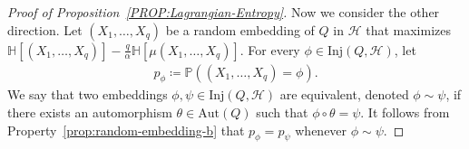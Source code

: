 \documentclass[11pt,a4paper]{article}
\begin{document}
\begin{proof}[Proof of Proposition~\ref{PROP:Lagrangian-Entropy}]
    Now we consider the other direction. 
    Let $(X_1, \ldots, X_{q})$ be a random embedding of $Q$ in $\mathcal{H}$ that maximizes $\mathbb{H}[(X_1, \ldots, X_{q})] - \frac{q}{\alpha} \mathbb{H}[\mu(X_1, \ldots, X_q)]$. 
    For every $\phi \in \mathrm{Inj}(Q, \mathcal{H})$, let 
    \begin{align*}
        p_{\phi}
        \coloneqq \mathbb{P}\left((X_1, \ldots, X_q) = \phi \right). 
    \end{align*}
    We say that two embeddings $\phi, \psi \in \mathrm{Inj}(Q,\mathcal{H})$ are equivalent, denoted $\phi \sim \psi$, if there exists an automorphism $\theta \in \mathrm{Aut}(Q)$ such that $\phi \circ \theta = \psi$. 
    It follows from Property~\ref{prop:random-embedding-b} that $p_{\phi} = p_{\psi}$ whenever $\phi\sim \psi$. 
    

\end{proof}
\end{document}
